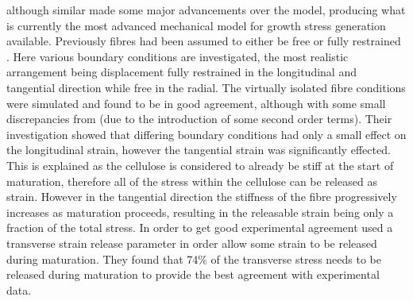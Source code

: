 \citet{Alm_ras_2005}
although similar made some major advancements over the \citet{Yamamoto_1998} model,
producing what is currently the most advanced mechanical model for growth
stress generation available. Previously fibres had been assumed to either be
free  or fully restrained \citep{archer1987,archer1989}. Here
various boundary conditions are investigated, the most realistic arrangement being
displacement fully restrained in the longitudinal and tangential direction while
free in the radial. The virtually isolated fibre conditions were simulated
and found to be in good agreement, although with some small discrepancies from
\citet{Yamamoto_1998} (due to the introduction of some second order terms).  Their
investigation showed that differing boundary conditions had only a small effect
on the longitudinal strain, however the tangential strain was significantly
effected. This is explained as the cellulose is considered to already be stiff at
the start of maturation, therefore all of the stress within the cellulose can be
released as strain. However in the tangential direction the stiffness of the
fibre progressively increases as maturation proceeds, resulting in the
releasable strain being only a fraction of the total stress. In order to get good
experimental agreement \citet{Alm_ras_2005} used a transverse strain release
parameter in order allow some strain to be released during maturation. They
found that 74\% of the transverse stress needs to be released during maturation
to provide the best agreement with experimental data.